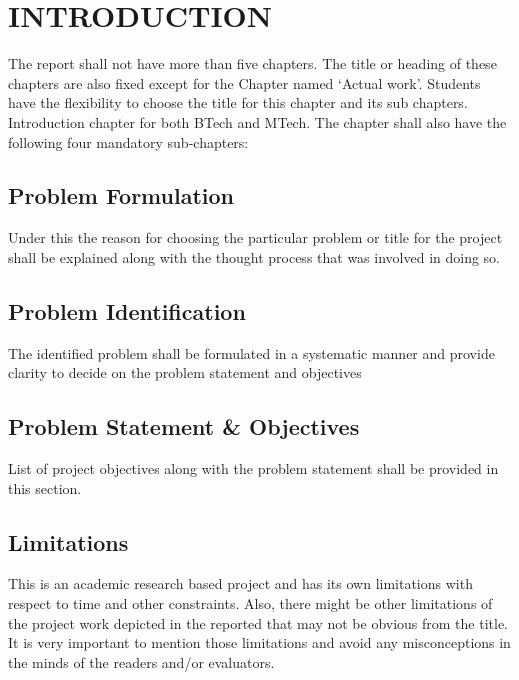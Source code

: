 \chapter{INTRODUCTION} %
\label{ChapterIntroduction} %



The report shall not have more than five chapters. The title or heading of these chapters are also fixed except for the Chapter named ‘Actual work’. Students have the flexibility to choose the title for this chapter and its sub chapters. 
\\
Introduction chapter for both BTech and MTech. The chapter shall also have the following four mandatory sub-chapters: 


\section{Problem Formulation}
Under this the reason for choosing the particular problem or title for the project shall be explained along with the thought process that was involved in doing so.

\section{Problem Identification}
The identified problem shall be formulated in a systematic manner and provide clarity to decide on the problem statement and objectives
	
\section{Problem Statement \& Objectives}
List of project objectives along with the problem statement shall be provided in this section.


\section{Limitations}
This is an academic research based project and has its own limitations with respect to time and other constraints. Also, there might be other limitations of the project work depicted in the reported that may not be obvious from the title. It is very important to mention those limitations and avoid any misconceptions in the minds of the readers and/or evaluators.
